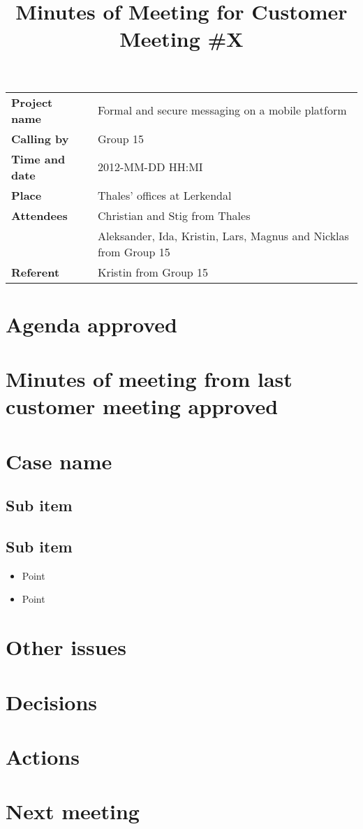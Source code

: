 
\title{Minutes of Meeting for Customer Meeting \#X}
\maketitle
\begin{tabular}{>{\bfseries}l l}	
Project name&Formal and secure messaging on a mobile platform\\
Calling by&Group 15\\
Time and date&2012-MM-DD HH:MI\\
Place&Thales' offices at Lerkendal\\
Attendees&Christian and Stig from Thales\\
& Aleksander, Ida, Kristin, Lars, Magnus and Nicklas from Group 15 \\
Referent&Kristin from Group 15\\
\end{tabular}

\section{Agenda approved}
\section{Minutes of meeting from last customer meeting approved}
\section{Case name}
\subsection{Sub item}
\subsection{Sub item}
\begin{itemize}
\item
Point
\item
Point
\end{itemize}
\section{Other issues}
\section{Decisions}
\section{Actions}
\section{Next meeting}
